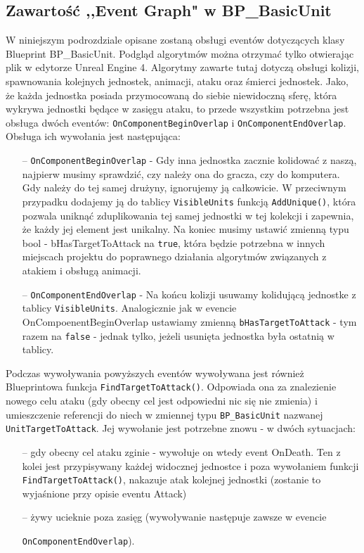 \documentclass[12pt]{report}
\begin{document}
\subsection{Zawartość ,,Event Graph" w BP\_BasicUnit}
W niniejszym podrozdziale opisane zostaną obsługi eventów dotyczących klasy Blueprint BP\_BasicUnit. Podgląd algorytmów można otrzymać tylko otwierając plik w edytorze Unreal Engine 4. Algorytmy zawarte tutaj dotyczą obsługi kolizji, spawnowania kolejnych jednostek, animacji, ataku oraz śmierci jednostek. Jako, że każda jednostka posiada przymocowaną do siebie niewidoczną sferę, która wykrywa jednostki będące w zasięgu ataku, to przede wszystkim potrzebna jest obsługa dwóch eventów: \texttt{OnComponentBeginOverlap} i \texttt{OnComponentEndOverlap}. Obsługa ich wywołania jest następująca:
\begin{itemize}
\item[--] \texttt{OnComponentBeginOverlap} - Gdy inna jednostka zacznie kolidować z naszą, najpierw musimy sprawdzić, czy należy ona do gracza, czy do komputera. Gdy należy do tej samej drużyny, ignorujemy ją całkowicie. W przeciwnym przypadku dodajemy ją do tablicy \texttt{VisibleUnits} funkcją \texttt{AddUnique()}, która pozwala uniknąć zduplikowania tej samej jednostki w tej kolekcji i zapewnia, że każdy jej element jest unikalny. Na koniec musimy ustawić zmienną typu bool - bHasTargetToAttack na \texttt{true}, która będzie potrzebna w innych miejscach projektu do poprawnego działania algorytmów związanych z atakiem i obsługą animacji.
\item[--] \texttt{OnComponentEndOverlap} - Na końcu kolizji usuwamy kolidującą jednostke z tablicy \texttt{VisibleUnits}. Analogicznie jak w evencie OnCompoenentBeginOverlap ustawiamy zmienną \texttt{bHasTargetToAttack} - tym razem na \texttt{false} - jednak tylko, jeżeli usunięta jednostka była ostatnią w tablicy.
\end{itemize}

Podczas wywoływania powyższych eventów wywoływana jest również Blueprintowa funkcja \texttt{FindTargetToAttack()}. Odpowiada ona za znalezienie nowego celu ataku (gdy obecny cel jest odpowiedni nic się nie zmienia) i umieszczenie referencji do niech w zmiennej typu \texttt{BP\_BasicUnit} nazwanej \texttt{UnitTargetToAttack}. Jej wywołanie jest potrzebne znowu - w dwóch sytuacjach:
\begin{itemize}
\item[--] gdy obecny cel ataku zginie - wywołuje on wtedy event OnDeath. Ten z kolei jest przypisywany każdej widocznej jednostce i poza wywołaniem funkcji \texttt{FindTargetToAttack()}, nakazuje atak kolejnej jednostki (zostanie to wyjaśnione przy opisie eventu Attack)
\item[--] żywy ucieknie poza zasięg (wywoływanie następuje zawsze w evencie

\texttt{OnComponentEndOverlap}).
\end{itemize}
\end{document}
